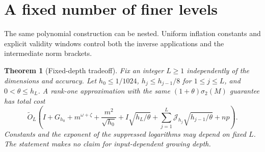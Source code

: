 \documentclass[11pt]{article}
\newtheorem{theorem}{Theorem}
\newcommand{\tO}{\widetilde O}
\begin{document}
\section{A fixed number of finer levels}
The same polynomial construction can be nested. Uniform inflation constants
and explicit validity windows control both the inverse applications and the
intermediate norm brackets.

\begin{theorem}[Fixed-depth tradeoff]\label{thm:multilevel}
Fix an integer \(L\geq1\) independently of the dimensions and accuracy.
Let \(h_0\leq1/1024\), \(h_j\leq h_{j-1}/8\) for \(1\leq j\leq L\),
and \(0<\theta\leq h_L\). A rank-one approximation with the same
\((1+\theta)\sigma_2(M)\) guarantee has total cost
\[
 \tO_L\!\left(I+G_{h_0}+m^{\omega+\zeta}+\frac{m^2}{\sqrt{h_0}}
       +I\sqrt{h_L/\theta}
       +\sum_{j=1}^L\mathcal J_{h_j}\sqrt{h_{j-1}/\theta}
       +np\right).
\]
Constants and the exponent of the suppressed logarithms may depend on
fixed \(L\). The statement makes no claim for input-dependent growing depth.
\end{theorem}
\end{document}

